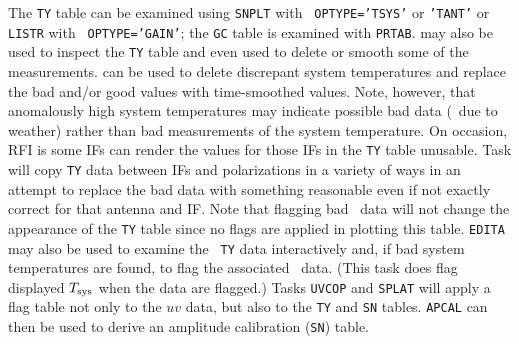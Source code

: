 The {\tt TY} table can be examined using {\tt SNPLT} with {\tt
OPTYPE='TSYS'} or {\tt 'TANT'} or {\tt LISTR} with {\tt
OPTYPE='GAIN'}; the {\tt GC} table is examined with {\tt PRTAB}\@.
{\tt {}} may also be used to inspect the {\tt TY} table and
even used to delete or smooth some of the measurements.
{\tt {}} can be used to delete discrepant system
temperatures and replace the bad and/or good values with time-smoothed
values.  Note, however, that anomalously high system temperatures may
indicate possible bad data (\eg\ due to weather) rather than bad
measurements of the system temperature.  On occasion, RFI is some IFs
can render the values for those IFs in the {\tt TY} table unusable.
Task {\tt {}} will copy {\tt TY} data between IFs and
polarizations in a variety of ways in an attempt to replace the bad
data with something reasonable even if not exactly correct for that
antenna and IF.  Note that flagging bad \uv\ data will not change the
appearance of the {\tt TY} table since no flags are applied in
plotting this table.  {\tt EDITA} may also be used to examine the {\tt
TY} data interactively and, if bad system temperatures are found, to
flag the associated \uv\ data.  (This task does flag displayed $T_{\rm
sys}$ when the data are flagged.)  Tasks {\tt UVCOP} and {\tt SPLAT}
will apply a flag table not only to the $uv$ data, but also to the
{\tt TY} and {\tt SN} tables.  {\tt APCAL} can then be used to derive
an amplitude calibration ({\tt SN}) table.

